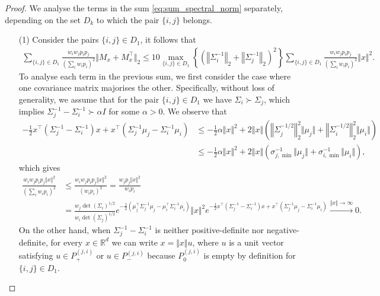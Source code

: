 \begin{proof}
We analyse the terms in the sum \eqref{eq:sum_spectral_norm} separately, depending on the set  $D_k$ to which the pair $\{i, j\}$ belongs. 
\begin{enumerate}
    \item[(1)] Consider the pairs $\{i, j\}\in D_1$, it follows that
\begin{align*}
    \sum_{\{i, j\}\in D_1}\frac{ w_iw_j p_i p_j }{(\sum_i w_i p_i)^2}\Vert M_x + M_x^{\intercal} \Vert_2  \leq 10 \max_{\{i, j\}\in D_1}\left\{\left(\left\Vert\Sigma_i^{-1}\right\Vert_2+ \left\Vert\Sigma_j^{-1}\right\Vert_2\right)^2\right\}\sum_{\{i,j\}\in D_1}\frac{ w_iw_j p_i p_j }{(\sum_i w_i p_i)^2}\Vert x\Vert^2.
\end{align*}
To analyse each term in the previous sum, we first consider the case where one  covariance matrix majorises the other. Specifically, without loss of generality, we assume that for the pair $\{i,j\}\in D_1$ we have $\Sigma_i\succ \Sigma_j$, which implies $\Sigma_{j}^{-1}-\Sigma_i^{-1}\succ \alpha I$ for some $\alpha>0$. We observe that 
\begin{align}
 - \frac{1}{2} x^{\intercal}\left(\Sigma_j^{-1}-\Sigma_i^{-1}\right)x + x^{\intercal}\left(\Sigma_j^{-1}\mu_j-\Sigma_i^{-1}\mu_i\right) &\leq -\frac{1}{2} \alpha  \Vert x\Vert^2 + 2 \Vert x\Vert \left(\left \Vert \Sigma_j^{-1/2}\right \Vert_2^2 \Vert \mu_j\Vert + \left \Vert \Sigma_i^{-1/2}\right\Vert_2^2 \Vert \mu_i\Vert   \right) \nonumber\\
 &\leq -\frac{1}{2} \alpha  \Vert x\Vert^2 + 2 \Vert x\Vert \left(\sigma_{j, \min}^{-1} \Vert \mu_j\Vert + \sigma_{i, \min}^{-1} \Vert \mu_i\Vert   \right), \label{eq:mixture_gaussians_term_bound_1}
\end{align}
which gives
\begin{align}
    \frac{ w_iw_j p_i p_j  \Vert x\Vert^2}{(\sum_i w_i p_i)^2}&\leq \frac{ w_iw_j p_i p_j \Vert x\Vert^2}{(w_i p_i)^2} =\frac{ w_j p_j  \Vert x\Vert^2}{w_i p_i}\nonumber\\
    &=  \frac{w_j \det(\Sigma_i)^{1/2}}{w_i \det(\Sigma_j)^{1/2}}  e^{-\frac{1}{2}\left(\mu_j^\intercal \Sigma_j^{-1} \mu_j-\mu_i^\intercal \Sigma_i^{-1} \mu_i\right)} \Vert x\Vert^2 e^{-\frac{1}{2} x^{\intercal}\left(\Sigma_j^{-1}-\Sigma_i^{-1}\right)x + x^{\intercal}\left(\Sigma_j^{-1}\mu_j-\Sigma_i^{-1}\mu_i\right)}  \xrightarrow{\Vert x\Vert \to \infty} 0.\label{eq:mixture_gaussians_term_bound_2}
\end{align}
On the other hand, when $\Sigma_j^{-1}-\Sigma_i^{-1}$ is neither positive-definite nor negative-definite, for every $x\in\mathbb{R}^d$ we can write $x = \Vert x\Vert u$, where $u$ is a unit vector satisfying $u\in P_{+}^{(j, i)}$ or $u\in P_{-}^{(j, i)}$ because $P_0^{(j, i)}$ is empty by definition for $\{i, j\}\in D_1$.

\end{enumerate}
\end{proof}
